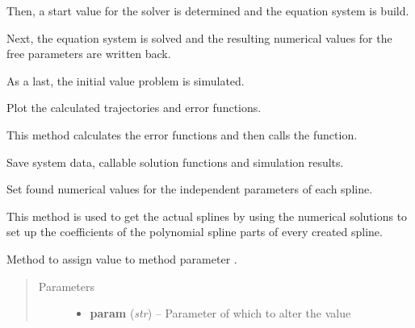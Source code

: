 \documentclass[letterpaper,10pt,english]{sphinxmanual}
\begin{document}
\begin{fulllineitems}
\begin{fulllineitems}
Then, a start value for the solver is determined and the equation system is build.

Next, the equation system is solved and the resulting numerical values for the free
parameters are written back.

As a last, the initial value problem is simulated.

\end{fulllineitems}


\begin{fulllineitems}
\label{pytrajectory:pytrajectory.trajectory.Trajectory.plot}
Plot the calculated trajectories and error functions.

This method calculates the error functions and then calls
the  function.

\end{fulllineitems}


\begin{fulllineitems}
\label{pytrajectory:pytrajectory.trajectory.Trajectory.save}
Save system data, callable solution functions and simulation results.

\end{fulllineitems}


\begin{fulllineitems}
\label{pytrajectory:pytrajectory.trajectory.Trajectory.setCoeff}
Set found numerical values for the independent parameters of each spline.

This method is used to get the actual splines by using the numerical
solutions to set up the coefficients of the polynomial spline parts of
every created spline.

\end{fulllineitems}


\begin{fulllineitems}
\label{pytrajectory:pytrajectory.trajectory.Trajectory.setParam}
Method to assign value  to method parameter .
\begin{quote}\begin{description}
\item[{Parameters}] \leavevmode\begin{itemize}
\item {} 
\textbf{param} (\emph{str}) -- Parameter of which to alter the value


\end{itemize}
\end{description}
\end{quote}
\end{fulllineitems}
\end{fulllineitems}
\end{document}
